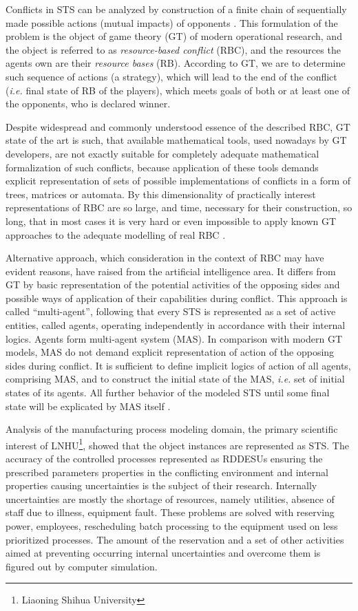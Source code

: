 \documentclass[conference]{IEEEtran}
\begin{document}
Conflicts in STS can be analyzed by construction of a finite chain of sequentially made possible actions (mutual impacts) of opponents \cite{rbg}. This formulation of the problem is the object of game theory (GT) of modern operational research, and the object is referred to as \emph{resource-based conflict} (RBC), and the resources the agents own are their \emph{resource bases} (RB). According to GT, we are to determine such sequence of actions (a strategy), which will lead to the end of the conflict (\emph{i.e.} final state of RB of the players), which meets goals of both or at least one of the opponents, who is declared winner.

Despite widespread and commonly understood essence of the described RBC, GT state of the art is such, that available mathematical tools, used nowadays by GT developers, are not exactly suitable for completely adequate mathematical formalization of such conflicts, because application of these tools demands explicit representation of sets of possible implementations of conflicts in a form of trees, matrices or automata. By this dimensionality of practically interest representations of RBC are so large, and time, necessary for their construction, so long, that in most cases it is very hard or even impossible to apply known GT approaches to the adequate modelling of real RBC \cite{rbg}.

Alternative approach, which consideration in the context of RBC may have evident reasons, have raised from the artificial intelligence area. It differs from GT by basic representation of the potential activities of the opposing sides and possible ways of application of their capabilities during conflict. This approach is called “multi-agent”, following that every STS is represented as a set of active entities, called agents, operating independently in accordance with their internal logics. Agents form multi-agent system (MAS). In comparison with modern GT models, MAS do not demand explicit representation of action of the opposing sides during conflict. It is sufficient to define implicit logics of action of all agents, comprising MAS, and to construct the initial state of the MAS, \emph{i.e.} set of initial states of its agents. All further behavior of the modeled STS until some final state will be explicated by MAS itself \cite{rbg}.

Analysis of the manufacturing process modeling domain, the primary scientific interest of LNHU\footnote{Liaoning Shihua University}, showed that the object instances are represented as STS. The accuracy of the controlled processes represented as RDDESUs ensuring the prescribed parameters properties in the conflicting environment and internal properties causing uncertainties is the subject of their research. Internally uncertainties are mostly the shortage of resources, namely utilities, absence of staff due to illness, equipment fault.  These problems are solved with reserving power, employees, rescheduling batch processing to the equipment used on less prioritized processes.  The amount of the reservation and a set of other activities aimed at preventing occurring internal uncertainties and overcome them is figured out by computer simulation.
\end{document}
